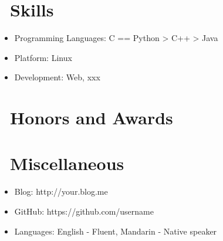 \documentclass{resume}
\begin{document}

\section{\faCogs\ Skills}
\begin{itemize}[parsep=0.5ex]
  \item Programming Languages: C == Python > C++ > Java
  \item Platform: Linux
  \item Development: Web, xxx
\end{itemize}

\section{\faHeartO\ Honors and Awards}

\section{\faInfo\ Miscellaneous}
\begin{itemize}[parsep=0.5ex]
  \item Blog: http://your.blog.me
  \item GitHub: https://github.com/username
  \item Languages: English - Fluent, Mandarin - Native speaker
\end{itemize}

%
%
\end{document}
